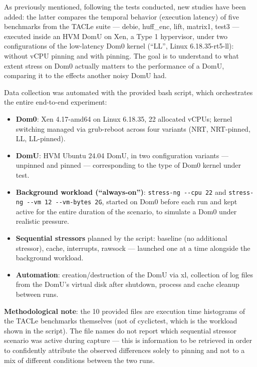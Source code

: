 As previously mentioned, following the tests conducted, new studies have
been added: the latter compares the temporal behavior (execution
latency) of five benchmarks from the TACLe suite --- debie, huff\_enc,
lift, matrix1, test3 --- executed inside an HVM DomU on Xen, a Type 1
hypervisor, under two configurations of the low-latency Dom0 kernel
(``LL'', Linux 6.18.35-rt5-ll): without vCPU pinning and with pinning.
The goal is to understand to what extent stress on Dom0 actually matters
to the performance of a DomU, comparing it to the effects another noisy
DomU had.

Data collection was automated with the provided bash script, which
orchestrates the entire end-to-end experiment:

\begin{itemize}
\item
  \textbf{Dom0}: Xen 4.17-amd64 on Linux 6.18.35, 22 allocated vCPUs;
  kernel switching managed via grub-reboot across four variants (NRT,
  NRT-pinned, LL, LL-pinned).
\item
  \textbf{DomU}: HVM Ubuntu 24.04 DomU, in two configuration variants
  --- unpinned and pinned --- corresponding to the type of Dom0 kernel
  under test.
\item
  \textbf{Background workload (``always-on'')}:
  \texttt{stress-ng\ -\/-cpu\ 22} and
  \texttt{stress-ng\ -\/-vm\ 12\ -\/-vm-bytes\ 2G}, started on Dom0
  before each run and kept active for the entire duration of the
  scenario, to simulate a Dom0 under realistic pressure.
\item
  \textbf{Sequential stressors} planned by the script: baseline (no
  additional stressor), cache, interrupts, rawsock --- launched one at a
  time alongside the background workload.
\item
  \textbf{Automation}: creation/destruction of the DomU via xl,
  collection of log files from the DomU's virtual disk after shutdown,
  process and cache cleanup between runs.
\end{itemize}

\textbf{Methodological note}: the 10 provided files are execution time
histograms of the TACLe benchmarks themselves (not of cyclictest, which
is the workload shown in the script). The file names do not report which
sequential stressor scenario was active during capture --- this is
information to be retrieved in order to confidently attribute the
observed differences solely to pinning and not to a mix of different
conditions between the two runs.

